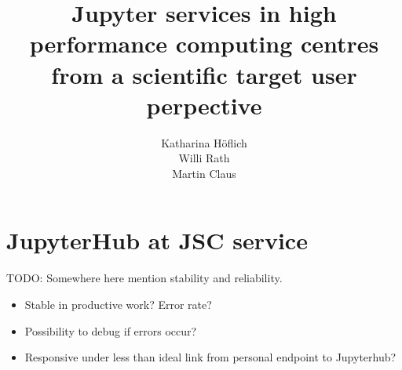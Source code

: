 \documentclass[11pt,a4paper]{article}
\title{\textbf{Jupyter services in high performance computing centres from a scientific target user perpective}}
\author{
	Katharina Höflich\\
	Willi Rath\\
  Martin Claus}
\begin{document}
\maketitle


\tableofcontents


%





\section{JupyterHub at JSC service}









TODO: Somewhere here mention stability and reliability.
\begin{itemize}
	\item Stable in productive work? Error rate?
  \item Possibility to debug if errors occur?
  \item Responsive under less than ideal link from personal endpoint to Jupyterhub?
\end{itemize}












\end{document}
